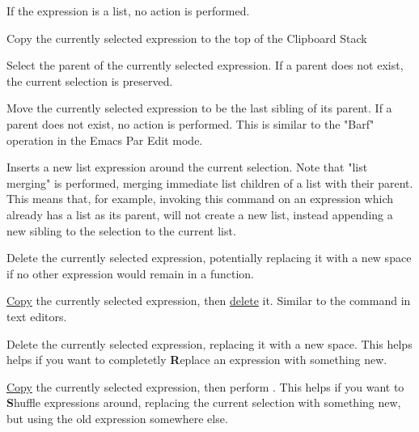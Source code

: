 If the expression is a list, no action is performed.


Copy the currently selected expression to the top of the Clipboard Stack

Select the parent of the currently selected expression. If a parent does not
exist, the current selection is preserved.

Move the currently selected expression to be the last sibling of its parent.
If a parent does not exist, no action is performed.
This is similar to the "Barf" operation in the Emacs Par Edit mode.


Inserts a new list expression around the current selection. Note that "list
merging" is performed, merging immediate list children of a list with their
parent. This means that, for example, invoking this command on an expression which
already has a list as its parent, will not create a new list, instead appending
a new sibling to the selection to the current list.

Delete the currently selected expression, potentially replacing it with a new
space if no other expression would remain in a function.


\hyperref[cmd:copy]{Copy} the currently selected expression, then
\hyperref[cmd:delete]{delete} it. Similar to the  command in
text editors.


Delete the currently selected expression, replacing it with a new space. This
helps helps if you want to completetly \textbf{R}eplace an expression with
something new.

\hyperref[cmd:copy]{Copy} the currently selected expression, then perform
\hyperref[cmd:delete_blank]{}. This helps if you want
to \textbf{S}huffle expressions around, replacing the current selection with
something new, but using the old expression somewhere else.

